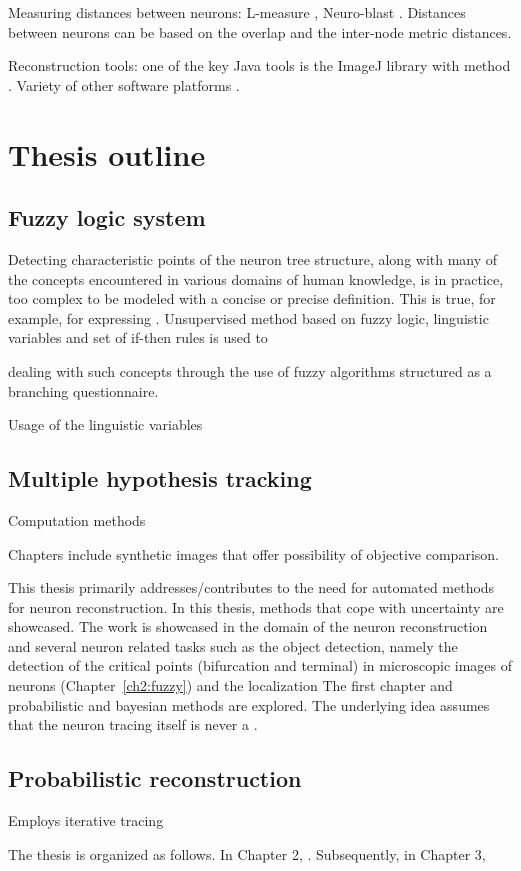 Measuring distances between neurons: L-measure \cite{scorcioni2008measure}, Neuro-blast \cite{wan2015blastneuron}. Distances between neurons can be based on the overlap and the inter-node metric distances.

Reconstruction tools: one of the key Java tools is the ImageJ library \cite{abramoff2004image} with method \cite{longair2011simple,pool2008neuritetracer}. Variety of other software platforms \cite{meijering2010neuron,acciai2016automated}. 

\section{Thesis outline}

\subsection{Fuzzy logic system}
Detecting characteristic points of the neuron tree structure, along with many of the concepts encountered in various domains of human knowledge, is in practice, too complex to be modeled with a concise or precise definition. This is true, for example, for expressing . Unsupervised method based on fuzzy logic, linguistic variables and set of if-then rules is used to 

dealing with such concepts through the use of fuzzy algorithms structured as a branching questionnaire.

Usage of the linguistic variables 

\subsection{Multiple hypothesis tracking}
Computation methods

Chapters include synthetic images that offer possibility of objective comparison.

This thesis primarily addresses/contributes to the need for automated methods for neuron reconstruction. 
In this thesis, methods that cope with uncertainty are showcased. The work is showcased in the domain of the neuron reconstruction and several neuron related tasks such as the object detection, namely the detection of the critical points (bifurcation and terminal) in microscopic images of neurons (Chapter~\ref{ch2:fuzzy}) and the localization  The first chapter  and probabilistic and bayesian methods are explored. The underlying idea assumes that the neuron tracing itself is never a .

\subsection{Probabilistic reconstruction}
Employs iterative tracing


The thesis is organized as follows. In Chapter 2,  . Subsequently, in Chapter 3, 

